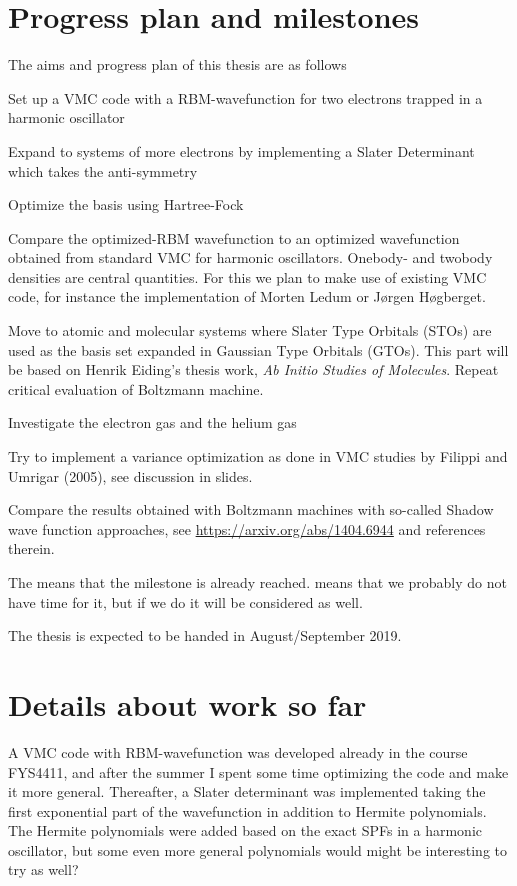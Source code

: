 \documentclass[10pt]{article}
\newcommand{\cmark}{\ding{51}}%
\newcommand{\xmark}{\ding{55}}%
\newcommand{\done}{\rlap{$\square$}{\raisebox{2pt}{\large\hspace{1pt}\cmark}}%
	\hspace{-2.5pt}}
\newcommand{\wontfix}{\rlap{$\square$}{\large\hspace{1pt}\xmark}}
\begin{document}
\section*{Progress plan and milestones}
The aims and progress plan of this thesis are as follows
\begin{todolist}
	\item[\done] Set up a VMC code with a RBM-wavefunction for two electrons trapped in a harmonic oscillator
	\item[\done] Expand to systems of more electrons by implementing a Slater Determinant which takes the anti-symmetry
	\item Optimize the basis using Hartree-Fock
	\item Compare the optimized-RBM wavefunction to an optimized wavefunction obtained from standard VMC for harmonic oscillators. Onebody- and twobody densities are central quantities. For this we plan to make use of existing VMC code, for instance the implementation of Morten Ledum or Jørgen Høgberget.
	\item Move to atomic and molecular systems where Slater Type Orbitals (STOs) are used as the basis set expanded in Gaussian Type Orbitals (GTOs). This part will be based on Henrik Eiding's thesis work, \textit{Ab Initio Studies of Molecules}. Repeat critical evaluation of Boltzmann machine.
	\item[\wontfix] Investigate the electron gas and the helium gas
	\item[\wontfix] Try to implement a variance optimization as done in VMC studies by Filippi and Umrigar (2005), see discussion in slides. 
	\item[\wontfix] Compare the results obtained with Boltzmann machines with so-called Shadow wave function approaches, see \url{https://arxiv.org/abs/1404.6944} and references therein.
\end{todolist}
The \cmark means that the milestone is already reached. \xmark means that we probably do not have time for it, but if we do it will be considered as well. 
 
The thesis is expected to be handed in August/September 2019.

\section*{Details about work so far}
A VMC code with RBM-wavefunction was developed already in the course FYS4411, and after the summer I spent some time optimizing the code and make it more general. Thereafter, a Slater determinant was implemented taking the first exponential part of the wavefunction in addition to Hermite polynomials. The Hermite polynomials were added based on the exact SPFs in a harmonic oscillator, but some even more general polynomials would might be interesting to try as well?
\end{document}
